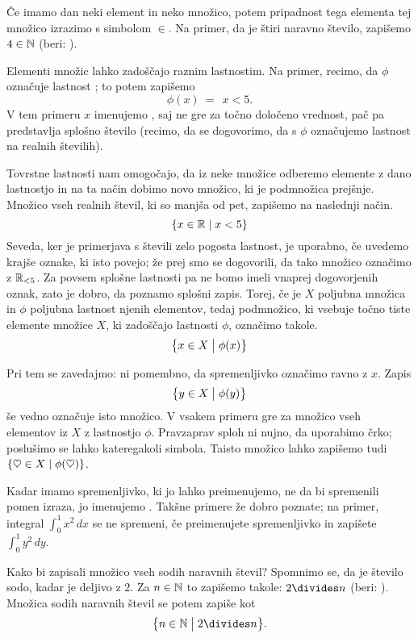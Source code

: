 Če imamo dan neki element in neko množico, potem pripadnost tega elementa tej množico izrazimo s simbolom $\in$. Na primer, da je štiri naravno število, zapišemo $4 \in \mathbb{N}$ (beri: ).

Elementi množic lahko zadoščajo raznim lastnostim. Na primer, recimo, da $\phi$ označuje lastnost ; to potem zapišemo
\[\phi(x) \ = \ \ x < 5.\]
V tem primeru $x$ imenujemo , saj ne gre za točno določeno vrednost, pač pa predstavlja splošno število (recimo, da se dogovorimo, da s $\phi$ označujemo lastnost na realnih številih).

Tovrstne lastnosti nam omogočajo, da iz neke množice odberemo elemente z dano lastnostjo in na ta način dobimo novo množico, ki je podmnožica prejšnje. Množico vseh realnih števil, ki so manjša od pet, zapišemo na naslednji način.
\[\set{x \in \RR}{x < 5}\]
Seveda, ker je primerjava s števili zelo pogosta lastnost, je uporabno, če uvedemo krajše oznake, ki isto povejo; že prej smo se dogovorili, da tako množico označimo z $\mathbb{R}_{< 5}$. Za povsem splošne lastnosti pa ne bomo imeli vnaprej dogovorjenih oznak, zato je dobro, da poznamo splošni zapis. Torej, če je $X$ poljubna množica in $\phi$ poljubna lastnost njenih elementov, tedaj podmnožico, ki vsebuje točno tiste elemente množice $X$, ki zadoščajo lastnosti $\phi$, označimo takole.
\[\set[1]{x \in X}{\phi(x)}\]

Pri tem se zavedajmo: ni pomembno, da spremenljivko označimo ravno z $x$. Zapis
\[\set[1]{y \in X}{\phi(y)}\]
še vedno označuje isto množico. V vsakem primeru gre za množico vseh elementov iz $X$ z lastnostjo $\phi$. Pravzaprav sploh ni nujno, da uporabimo črko; poslušimo se lahko kateregakoli simbola. Taisto množico lahko zapišemo tudi $\set{\heartsuit \in X}{\phi(\heartsuit)}$.

Kadar imamo spremenljivko, ki jo lahko preimenujemo, ne da bi spremenili pomen izraza, jo imenujemo . Takšne primere že dobro poznate; na primer, integral $\int_0^1 x^2 \,dx$ se ne spremeni, če preimenujete spremenljivko in zapišete $\int_0^1 y^2 \,dy$.

\begin{zgled}
Kako bi zapisali množico vseh sodih naravnih števil? Spomnimo se, da je število sodo, kadar je deljivo z $2$. Za $n \in \mathbb{N}$ to zapišemo takole: $2 \divides n$ (beri: ). Množica sodih naravnih števil se potem zapiše kot
\[\set[1]{n \in \NN}{2 \divides n}.\]
\end{zgled}


